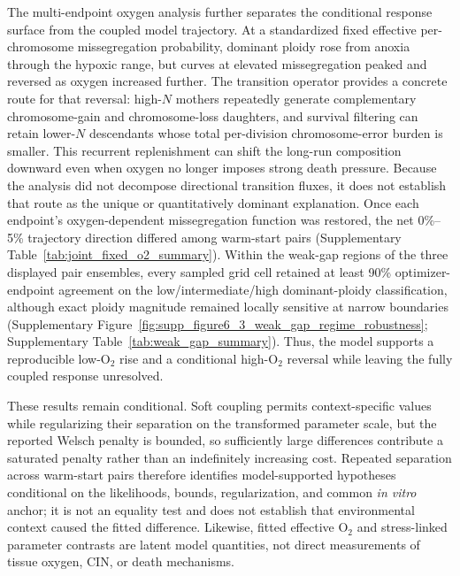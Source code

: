 \documentclass[11pt]{article}
\begin{document}
The multi-endpoint oxygen analysis further separates the conditional response surface from the coupled model trajectory. At a standardized fixed effective per-chromosome missegregation probability, dominant ploidy rose from anoxia through the hypoxic range, but curves at elevated missegregation peaked and reversed as oxygen increased further. The transition operator provides a concrete route for that reversal: high-\(N\) mothers repeatedly generate complementary chromosome-gain and chromosome-loss daughters, and survival filtering can retain lower-\(N\) descendants whose total per-division chromosome-error burden is smaller. This recurrent replenishment can shift the long-run composition downward even when oxygen no longer imposes strong death pressure. Because the analysis did not decompose directional transition fluxes, it does not establish that route as the unique or quantitatively dominant explanation. Once each endpoint's oxygen-dependent missegregation function was restored, the net 0\%--5\% trajectory direction differed among warm-start pairs (Supplementary Table~\ref{tab:joint_fixed_o2_summary}). Within the weak-gap regions of the three displayed pair ensembles, every sampled grid cell retained at least 90\% optimizer-endpoint agreement on the low/intermediate/high dominant-ploidy classification, although exact ploidy magnitude remained locally sensitive at narrow boundaries (Supplementary Figure~\ref{fig:supp_figure6_3_weak_gap_regime_robustness}; Supplementary Table~\ref{tab:weak_gap_summary}). Thus, the model supports a reproducible low-O$_2$ rise and a conditional high-O$_2$ reversal while leaving the fully coupled response unresolved.

These results remain conditional. Soft coupling permits context-specific values while regularizing their separation on the transformed parameter scale, but the reported Welsch penalty is bounded, so sufficiently large differences contribute a saturated penalty rather than an indefinitely increasing cost. Repeated separation across warm-start pairs therefore identifies model-supported hypotheses conditional on the likelihoods, bounds, regularization, and common \textit{in vitro} anchor; it is not an equality test and does not establish that environmental context caused the fitted difference. Likewise, fitted effective O$_2$ and stress-linked parameter contrasts are latent model quantities, not direct measurements of tissue oxygen, CIN, or death mechanisms.
\end{document}
